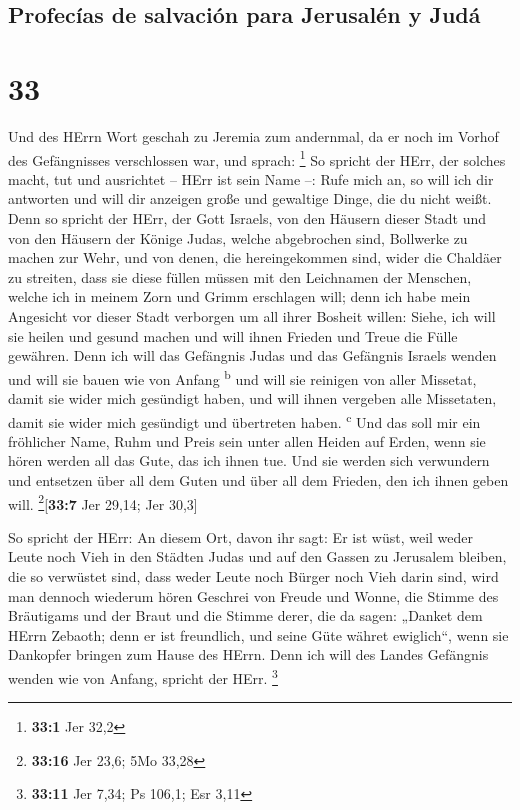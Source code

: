 \hypertarget{profecuxedas-de-salvaciuxf3n-para-jerusaluxe9n-y-juduxe1}{%
\subsection{Profecías de salvación para Jerusalén y
Judá}\label{profecuxedas-de-salvaciuxf3n-para-jerusaluxe9n-y-juduxe1}}

\hypertarget{section-32}{%
\section{33}\label{section-32}}

 Und des HErrn Wort geschah zu Jeremia zum andernmal, da
er noch im Vorhof des Gefängnisses verschlossen war, und sprach:
\footnote{\textbf{33:1} Jer 32,2}  So spricht der HErr,
der solches macht, tut und ausrichtet -- HErr ist sein Name --:
 Rufe mich an, so will ich dir antworten und will dir
anzeigen große und gewaltige Dinge, die du nicht weißt. 
Denn so spricht der HErr, der Gott Israels, von den Häusern dieser Stadt
und von den Häusern der Könige Judas, welche abgebrochen sind, Bollwerke
zu machen zur Wehr,  und von denen, die hereingekommen
sind, wider die Chaldäer zu streiten, dass sie diese füllen müssen mit
den Leichnamen der Menschen, welche ich in meinem Zorn und Grimm
erschlagen will; denn ich habe mein Angesicht vor dieser Stadt verborgen
um all ihrer Bosheit willen:  Siehe, ich will sie heilen
und gesund machen und will ihnen Frieden und Treue die Fülle gewähren.
 Denn ich will das Gefängnis Judas und das Gefängnis
Israels wenden und will sie bauen wie von Anfang \textsuperscript{b}
 und will sie reinigen von aller Missetat, damit sie wider
mich gesündigt haben, und will ihnen vergeben alle Missetaten, damit sie
wider mich gesündigt und übertreten haben. \textsuperscript{c}
 Und das soll mir ein fröhlicher Name, Ruhm und Preis sein
unter allen Heiden auf Erden, wenn sie hören werden all das Gute, das
ich ihnen tue. Und sie werden sich verwundern und entsetzen über all dem
Guten und über all dem Frieden, den ich ihnen geben will.
\footnote{\textbf{33:16} Jer 23,6; 5Mo 33,28}{[}\textbf{33:7} Jer 29,14;
Jer 30,3{]}

 So spricht der HErr: An diesem Ort, davon ihr sagt: Er
ist wüst, weil weder Leute noch Vieh in den Städten Judas und auf den
Gassen zu Jerusalem bleiben, die so verwüstet sind, dass weder Leute
noch Bürger noch Vieh darin sind,  wird man dennoch
wiederum hören Geschrei von Freude und Wonne, die Stimme des Bräutigams
und der Braut und die Stimme derer, die da sagen: „Danket dem HErrn
Zebaoth; denn er ist freundlich, und seine Güte währet ewiglich``, wenn
sie Dankopfer bringen zum Hause des HErrn. Denn ich will des Landes
Gefängnis wenden wie von Anfang, spricht der HErr. \footnote{\textbf{33:11}
  Jer 7,34; Ps 106,1; Esr 3,11}


